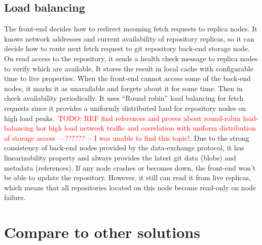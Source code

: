 \documentclass[acmlarge, screen, nonacm, 11pt]{acmart}
\newcommand{\todo}[1]{\textcolor{red}{TODO: #1}}
\begin{document}
\subsection{Load balancing}\label{sec:load-balancing}

The front-end decides how to redirect incoming fetch requests to replica nodes.
It knows network addresses and current availability of repository replicas,
so it can decide how to route next fetch request to git repository back-end storage node.
On read access to the repository, it sends a health check message to replica nodes to verify
which are available. It stores the result in local cache with configurable time to live
properties. When the front-end cannot access some of the back-end nodes, it marks it as unavailable
and forgets about it for some time. Then in check availability periodically.
It uses ``Round robin'' load balancing for fetch requests since it provides a uniformly distributed
load for repository nodes on high load peaks.~\todo{REF find references and proves about round-robin
load-balancing hor high load network traffic and correlation with uniform distribution of storage access ---??????--- I was unable to find this topic!}.
Due to the strong consistency of back-end nodes provided by the data-exchange protocol,
it has linearizability property and always provides the latest git data (blobs) and metadata (references).
If any node crashes or becomes down, the front-end won't be able to update the repository. However, it still can read it from live replicas, which means that all repositories located on this
node become read-only on node failure.

\section{Compare to other solutions}\label{sec:compare}
\end{document}
